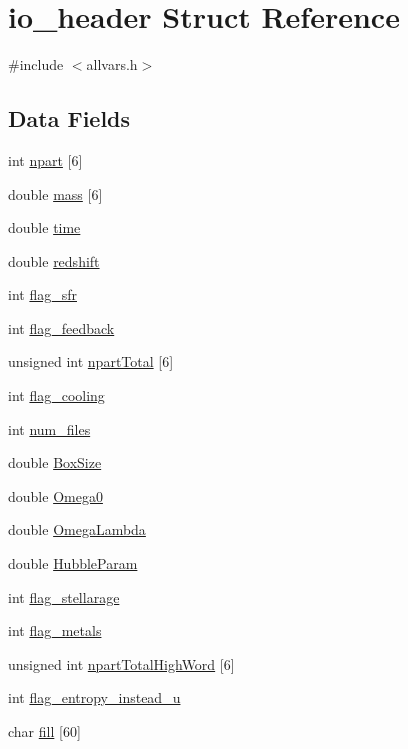 \hypertarget{structio__header}{
\section{io\_\-header Struct Reference}
\label{structio__header}
}


{\ttfamily \#include $<$allvars.h$>$}

\subsection*{Data Fields}
\begin{DoxyCompactItemize}
\item 
int \hyperlink{structio__header_adc88d581cf3d57eb975a51f587538bdd}{npart} \mbox{[}6\mbox{]}
\item 
double \hyperlink{structio__header_a2c387b0c7c823287d424fedc70175917}{mass} \mbox{[}6\mbox{]}
\item 
double \hyperlink{structio__header_ad6237959a3590772366f18000a47a7d6}{time}
\item 
double \hyperlink{structio__header_ae2484703f374288fb266ff268a1ffa91}{redshift}
\item 
int \hyperlink{structio__header_afe21a629578012fd99d118d2ad834763}{flag\_\-sfr}
\item 
int \hyperlink{structio__header_a98679063cc311c5f6184459600fa05a5}{flag\_\-feedback}
\item 
unsigned int \hyperlink{structio__header_ad63a8b413a6b56c33bf5ecc25550a6dd}{npartTotal} \mbox{[}6\mbox{]}
\item 
int \hyperlink{structio__header_ae877c2fcde2f096886193c22b9b73cbf}{flag\_\-cooling}
\item 
int \hyperlink{structio__header_a5688351781a2845beb2c52a035cc5f71}{num\_\-files}
\item 
double \hyperlink{structio__header_aacb7ba10d16ae90490a9deba37ace731}{BoxSize}
\item 
double \hyperlink{structio__header_af0d78ac0e8131523be64b3686aab9550}{Omega0}
\item 
double \hyperlink{structio__header_aa2cdc9653addc264b58134006bca1bb8}{OmegaLambda}
\item 
double \hyperlink{structio__header_ad0f0d02804350f8935aadca9b5ef0fcf}{HubbleParam}
\item 
int \hyperlink{structio__header_abe83e840bb4778a3be11a084dfa85c3c}{flag\_\-stellarage}
\item 
int \hyperlink{structio__header_ac025f6c1cff1914d893ce0c7c5fd46bb}{flag\_\-metals}
\item 
unsigned int \hyperlink{structio__header_a56f54a68fe289b19902b3c4c561a7159}{npartTotalHighWord} \mbox{[}6\mbox{]}
\item 
int \hyperlink{structio__header_a448788ace72155e22d19af1c01917857}{flag\_\-entropy\_\-instead\_\-u}
\item 
char \hyperlink{structio__header_ac458badfa44878ddc5deb856531a2ee2}{fill} \mbox{[}60\mbox{]}
\end{DoxyCompactItemize}


